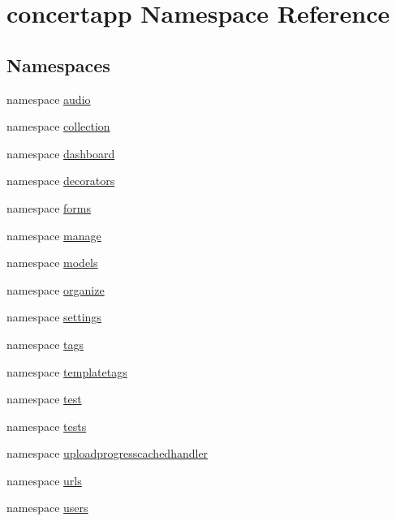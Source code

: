 \hypertarget{namespaceconcertapp}{
\section{concertapp Namespace Reference}
\label{namespaceconcertapp}
}
\subsection*{Namespaces}
\begin{DoxyCompactItemize}
\item 
namespace \hyperlink{namespaceconcertapp_1_1audio}{audio}
\item 
namespace \hyperlink{namespaceconcertapp_1_1collection}{collection}
\item 
namespace \hyperlink{namespaceconcertapp_1_1dashboard}{dashboard}
\item 
namespace \hyperlink{namespaceconcertapp_1_1decorators}{decorators}
\item 
namespace \hyperlink{namespaceconcertapp_1_1forms}{forms}
\item 
namespace \hyperlink{namespaceconcertapp_1_1manage}{manage}
\item 
namespace \hyperlink{namespaceconcertapp_1_1models}{models}
\item 
namespace \hyperlink{namespaceconcertapp_1_1organize}{organize}
\item 
namespace \hyperlink{namespaceconcertapp_1_1settings}{settings}
\item 
namespace \hyperlink{namespaceconcertapp_1_1tags}{tags}
\item 
namespace \hyperlink{namespaceconcertapp_1_1templatetags}{templatetags}
\item 
namespace \hyperlink{namespaceconcertapp_1_1test}{test}
\item 
namespace \hyperlink{namespaceconcertapp_1_1tests}{tests}
\item 
namespace \hyperlink{namespaceconcertapp_1_1uploadprogresscachedhandler}{uploadprogresscachedhandler}
\item 
namespace \hyperlink{namespaceconcertapp_1_1urls}{urls}
\item 
namespace \hyperlink{namespaceconcertapp_1_1users}{users}
\end{DoxyCompactItemize}

